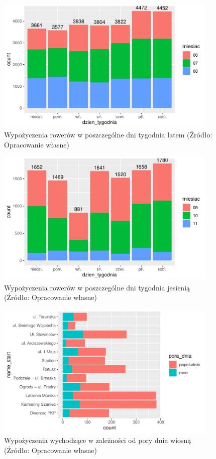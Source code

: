 \documentclass{amuthesis}
\begin{document}
\begin{figure}[t]

{\centering \includegraphics[width=400px]{figures/analiza4-1} 

}

\caption{Wypożyczenia rowerów w poszczególne dni tygodnia latem (Źródło: Opracowanie własne)}\label{fig:analiza4}
\end{figure}

\begin{figure}[t]

{\centering \includegraphics[width=400px]{figures/analiza5-1} 

}

\caption{Wypożyczenia rowerów w poszczególne dni tygodnia jesienią (Źródło: Opracowanie własne)}\label{fig:analiza5}
\end{figure}
\begin{figure}[t]

{\centering \includegraphics[width=400px]{figures/analiza6-1} 

}

\caption{Wypożyczenia wychodzące w zależności od pory dnia wiosną (Źródło: Opracowanie własne)}\label{fig:analiza6}
\end{figure}
\end{document}
